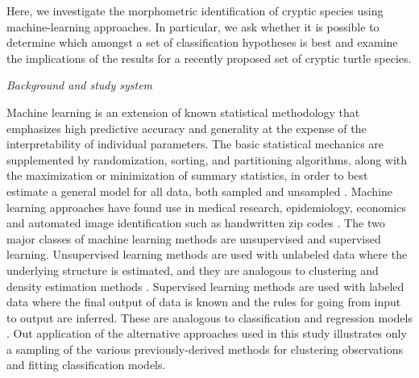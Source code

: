 \documentclass[12pt,letterpaper]{article}
\renewcommand{\subsection}[1]{%
\bigskip
\begin{center}
\begin{large}
\normalfont\itshape #1
\end{large}
\end{center}}
\begin{document}
Here, we investigate the morphometric identification of cryptic species using machine-learning approaches. In particular, we ask whether it is possible to determine which amongst a set of classification hypotheses is best and examine the implications of the results for a recently proposed set of cryptic turtle species.

\subsection{Background and study system}
Machine learning is an extension of known statistical methodology \citep{Hastie2009} that emphasizes high predictive accuracy and generality at the expense of the interpretability of individual parameters. The basic statistical mechanics are supplemented by randomization, sorting, and partitioning algorithms, along with the maximization or minimization of summary statistics, in order to best estimate a general model for all data, both sampled and unsampled \citep{Hastie2009}. Machine learning approaches have found use in medical research, epidemiology, economics and automated image identification such as handwritten zip codes \citep{Hastie2009}. The two major classes of machine learning methods are unsupervised and supervised learning. Unsupervised learning methods are used with unlabeled data where the underlying structure is estimated, and they are analogous to clustering and density estimation methods \citep{Kaufman1990}. Supervised learning methods are used with labeled data where the final output of data is known and the rules for going from input to output are inferred. These are analogous to classification and regression models \citep{Breiman1984}. Out application of the alternative approaches used in this study illustrates only a sampling of the various previously-derived methods for clustering observations and fitting classification models. 
\end{document}
